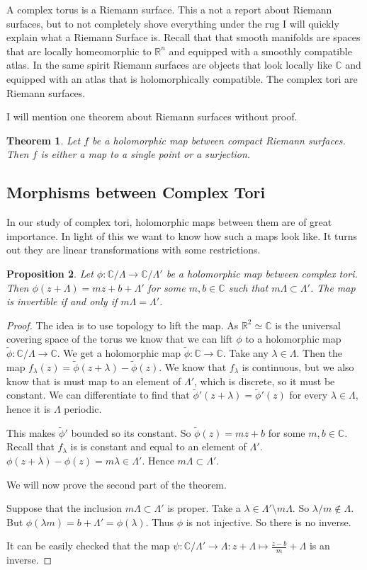 \documentclass[titlepage,a4paper]{article}
\theoremstyle{theoremdd}
\newtheorem{theorem}{Theorem}[section]
\newtheorem{proposition}[theorem]{Proposition}
\theoremstyle{definitiondd}
\theoremstyle{remarkdd}
\newcommand{\C}{\mathbb{C}}
\newcommand{\R}{\mathbb{R}}
\newcommand{\ltr}{\par \noindent \framebox[1\width]{ $\implies$ } \hspace{.2cm}}
\newcommand{\rtl}{\par \noindent \framebox[1\width]{ $\impliedby$ } \hspace{.2cm} }
\begin{document}
A complex torus is a Riemann surface. This a not a report about Riemann surfaces, but to not completely shove everything under the rug I will quickly explain what a Riemann Surface is.
Recall that that smooth manifolds are spaces that are locally homeomorphic to $\R^{n}$ and equipped with a smoothly compatible atlas. 
In the same spirit Riemann surfaces are objects that look locally like $\C$ and equipped with an atlas that is holomorphically compatible.
The complex tori are Riemann surfaces. 

I will mention one theorem about Riemann surfaces without proof. 
\begin{theorem}
	Let $f$ be a holomorphic map between compact Riemann surfaces. Then $f$ is either a map to a single point or a surjection.
\end{theorem}

\subsection{Morphisms between Complex Tori}

In our study of complex tori, holomorphic maps between them are of great importance. 
In light of this we want to know how such a maps look like. It turns out they are linear transformations with some restrictions. 
\begin{proposition}
	Let $\phi: \C / \Lambda \to \C / \Lambda'$ be a holomorphic map between complex tori. 
	Then $\phi(z + \Lambda) = mz + b + \Lambda'$ for some $m, b \in \C$ such that $m \Lambda \subset  \Lambda'$. 
	The map is invertible if and only if $m \Lambda = \Lambda'$.
\end{proposition}
\begin{proof}
	The idea is to use topology to lift the map. As $\R^2 \simeq \C$ is the universal covering space of the torus we know that we can lift $\phi$ to a holomorphic map $\tilde \phi: \C / \Lambda \to \C$. We get a holomorphic map  $\tilde \phi: \C \to \C$.
	Take any $\lambda \in \Lambda$. 
	Then the map $f_\lambda(z) = \tilde\phi(z + \lambda) - \tilde \phi(z)$. We know that $f_{\lambda}$ is continuous, but we also know that is must map to an element of $\Lambda'$, which is discrete, so it must be constant. 
	We can differentiate to find that $\tilde\phi'(z+ \lambda) = \tilde\phi'(z)$ for every $\lambda \in \Lambda$, hence it is  $\Lambda$ periodic. 

	This makes $\tilde\phi'$ bounded so its constant. 
	So $\tilde \phi(z) = mz + b$ for some $m, b \in \C$. 
	Recall that $f_{\lambda}$ is is constant and equal to an element of $\Lambda'$. 
	$\phi(z+\lambda) - \phi(z) = m\lambda \in \Lambda'$. 
	Hence $m \Lambda \subset \Lambda'$.

	We will now prove the second part of the theorem.
	\ltr Suppose that the inclusion  $m\Lambda \subset \Lambda'$ is proper. 
	Take a $\lambda \in \Lambda' \setminus m\Lambda$. 
	So $\lambda / m \not\in  \Lambda$. But $\phi(\lambda m) = b + \Lambda' = \phi(\lambda)$. Thus $\phi$ is not injective. So there is no inverse.
	\rtl It can be easily checked that the map $\psi: \C / \Lambda' \to \Lambda: z + \Lambda \mapsto  \frac{z-b}{m} + \Lambda$ is an inverse. 
\end{proof}
\end{document}
